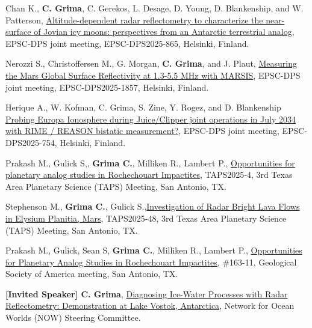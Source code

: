 \begin{etaremune}
\item
    Chan K., \textbf{C. Grima}, C. Gerekos, L. Desage, D. Young, D. Blankenship, and W. Patterson, \href{https://meetingorganizer.copernicus.org/EPSC-DPS2025/EPSC-DPS2025-865.html}{Altitude-dependent radar reflectometry to characterize the near-surface of Jovian icy moons: perspectives from an Antarctic terrestrial analog}, EPSC-DPS joint meeting, EPSC-DPS2025-865, Helsinki, Finland.

\item
    Nerozzi S., Christoffersen M., G. Morgan, \textbf{C. Grima}, and J. Plaut,
    \href{https://meetingorganizer.copernicus.org/EPSC-DPS2025/EPSC-DPS2025-1857.html}{Measuring the Mars Global Surface Reflectivity at 1.3-5.5 MHz with MARSIS}, EPSC-DPS joint meeting, EPSC-DPS2025-1857, Helsinki, Finland.

\item
    Herique A., W. Kofman, C. Grima, S. Zine, Y. Rogez, and D. Blankenship
    \href{https://meetingorganizer.copernicus.org/EPSC-DPS2025/EPSC-DPS2025-754.html}{Probing Europa Ionosphere during Juice/Clipper joint operations in July 2034 with RIME / REASON bistatic measurement?}, EPSC-DPS joint meeting, EPSC-DPS2025-754, Helsinki, Finland.

\item
    Prakash M., Gulick S,, \textbf{Grima C.}, Milliken R., Lambert P., \href{https://drive.google.com/file/d/17az1nF6I3r7X9oDx1pU0o_pdRNJGvrgU/view}{Opportunities for planetary analog studies in Rochechouart
Impactites}, TAPS2025‐4, 3rd Texas Area Planetary Science (TAPS) Meeting, San Antonio, TX.

\item
    Stephenson M., \textbf{Grima C.}, Gulick S.,\href{https://drive.google.com/file/d/17az1nF6I3r7X9oDx1pU0o_pdRNJGvrgU/view}{Investigation of Radar Bright Lava Flows in Elysium Planitia,
Mars}, TAPS2025‐48, 3rd Texas Area Planetary Science (TAPS) Meeting, San Antonio, TX.

\item
    Prakash M., Gulick, Sean S, \textbf{Grima C.}, Milliken R., Lambert P., \href{https://gsameetings.secure-platform.com/connects25/solicitations/103002/sessiongallery/schedule/items/95163/application/7413}{Opportunities for Planetary Analog Studies in Rochechouart Impactites}, \#163-11, Geological Society of America meeting, San Antonio, TX.

\item
    \textbf{[Invited Speaker] C. Grima}, \href{}{Diagnosing Ice-Water Processes with Radar Reflectometry: Demonstration at Lake Vostok, Antarctica}, Network for Ocean Worlds (NOW) Steering Committee.


\end{etaremune}
